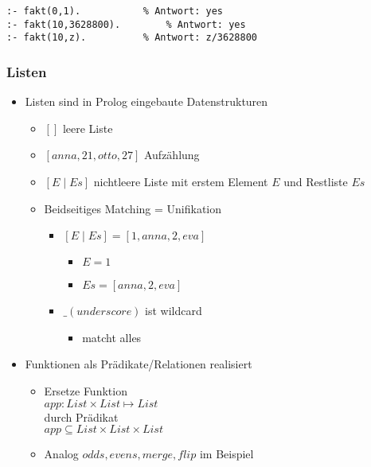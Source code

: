 \documentclass{scrartcl}
\begin{document}
\begin{lstlisting}
:- fakt(0,1).			% Antwort: yes
:- fakt(10,3628800).		% Antwort: yes
:- fakt(10,z).			% Antwort: z/3628800
\end{lstlisting}

\subsubsection{Listen}

\begin{itemize}
	\item Listen sind in Prolog eingebaute Datenstrukturen
	\begin{itemize}
		\item $[]$ leere Liste
		\item $[anna, 21, otto, 27]$ Aufzählung
		\item $[E \mid Es]$ nichtleere Liste mit erstem Element $E$ und Restliste $Es$
		\item Beidseitiges Matching = Unifikation
		\begin{itemize}
			\item $[E \mid Es] = [1,anna,2,eva]$
			\begin{itemize}
				\item $E = 1$
				\item $Es = [anna, 2, eva]$
			\end{itemize}
			\item $\_(underscore)$ ist wildcard
			\begin{itemize}
				\item matcht alles
			\end{itemize}
		\end{itemize}
	\end{itemize}
	\item Funktionen als Prädikate/Relationen realisiert
	\begin{itemize}
		\item Ersetze Funktion \\
		$app: List \times List \mapsto List$ \\
		durch Prädikat \\
		$app \subseteq List \times List \times List$
		\item Analog $odds, evens, merge, flip$ im Beispiel
	\end{itemize}
\end{itemize}
\end{document}
